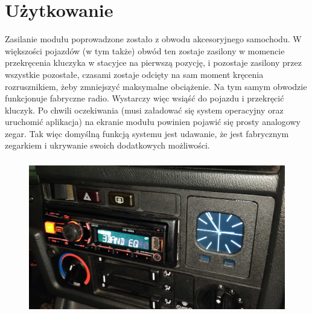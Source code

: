 \documentclass[declaration,shortabstract, inz]{iithesis}
\begin{document}

\chapter{Użytkowanie}
Zasilanie modułu poprowadzone zostało z obwodu akcesoryjnego samochodu. W większości pojazdów (w tym także) obwód ten zostaje zasilony w momencie przekręcenia kluczyka w stacyjce na pierwszą pozycję, i pozostaje zasilony przez wszystkie pozostałe, czasami zostaje odcięty na sam moment kręcenia rozrusznikiem, żeby zmniejszyć maksymalne obciążenie. Na tym samym obwodzie funkcjonuje fabryczne radio. Wystarczy więc wsiąść do pojazdu i przekręcić kluczyk. Po chwili oczekiwania (musi załadować się system operacyjny oraz uruchomić aplikacja) na ekranie modułu powinien pojawić się prosty analogowy zegar. Tak więc domyślną funkcją systemu jest udawanie, że jest fabrycznym zegarkiem i ukrywanie swoich dodatkowych możliwości.

\begin{figure}[htp]
    \centering
    \includegraphics[width=12cm, height=6.75cm]{images/cocpit_clock.jpg}
    \label{fig:cocpit_clock}
\end{figure}
\end{document}
